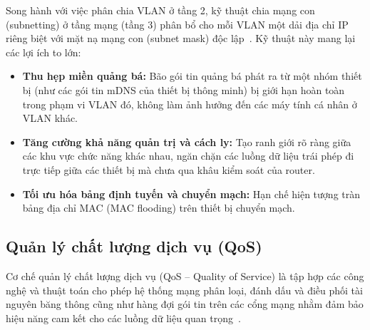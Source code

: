 Song hành với việc phân chia VLAN ở tầng 2, kỹ thuật chia mạng con (subnetting) ở tầng mạng (tầng 3) phân bổ cho mỗi VLAN một dải địa chỉ IP riêng biệt với mặt nạ mạng con (subnet mask) độc lập~\cite{kurose2021computer, doxuancho2018}. Kỹ thuật này mang lại các lợi ích to lớn:
\begin{itemize}
    \item \textbf{Thu hẹp miền quảng bá:} Bão gói tin quảng bá phát ra từ một nhóm thiết bị (như các gói tin mDNS của thiết bị thông minh) bị giới hạn hoàn toàn trong phạm vi VLAN đó, không làm ảnh hưởng đến các máy tính cá nhân ở VLAN khác.
    \item \textbf{Tăng cường khả năng quản trị và cách ly:} Tạo ranh giới rõ ràng giữa các khu vực chức năng khác nhau, ngăn chặn các luồng dữ liệu trái phép đi trực tiếp giữa các thiết bị mà chưa qua khâu kiểm soát của router.
    \item \textbf{Tối ưu hóa bảng định tuyến và chuyển mạch:} Hạn chế hiện tượng tràn bảng địa chỉ MAC (MAC flooding) trên thiết bị chuyển mạch.
\end{itemize}

\subsection{Quản lý chất lượng dịch vụ (QoS)}
\label{subsec:quan-ly-qos}

Cơ chế quản lý chất lượng dịch vụ (QoS -- Quality of Service) là tập hợp các công nghệ và thuật toán cho phép hệ thống mạng phân loại, đánh dấu và điều phối tài nguyên băng thông cũng như hàng đợi gói tin trên các cổng mạng nhằm đảm bảo hiệu năng cam kết cho các luồng dữ liệu quan trọng~\cite{ciscoqos2014}.

